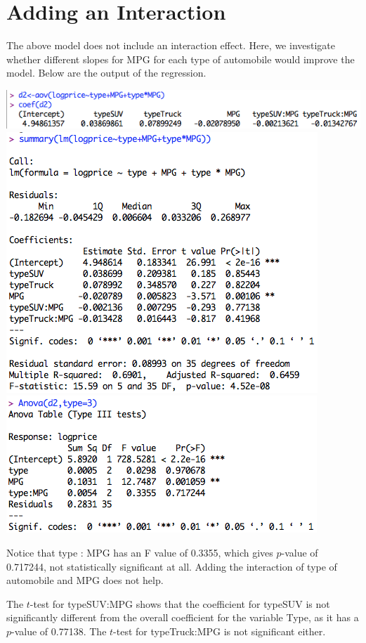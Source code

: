 \documentclass[a4 paper, 11 pt]{article}
\begin{document}
\section{Adding an Interaction}
The above model does not include an interaction effect. Here, we investigate whether different slopes for MPG for each type of automobile would improve the model. Below are the output of the regression.
\begin{center}
\includegraphics[scale=0.5]{d2a} \\
\includegraphics[scale=0.5]{d2b} \\
\includegraphics[scale=0.5]{d2c}
\end{center}
Notice that type : MPG has an F value of 0.3355, which gives $p$-value of 0.717244, not statistically significant at all. Adding the interaction of type of automobile and MPG does not help.

The $t$-test for typeSUV:MPG shows that the coefficient for typeSUV is not significantly different from the overall coefficient for the variable Type, as it has a $p$-value of 0.77138. The $t$-test for typeTruck:MPG is not significant either.
\end{document}
